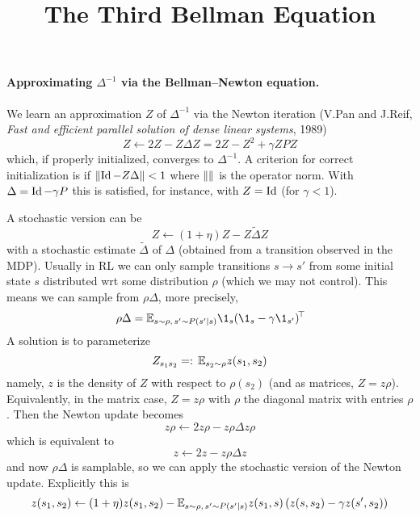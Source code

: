 \documentclass[11pt,a4paper]{article}
\title{The Third Bellman Equation}
\author{}
\begin{document}
\maketitle

\paragraph{Approximating $\Delta^{-1}$ via the Bellman--Newton equation.}
We learn an approximation $Z$ of $\Delta^{-1}$ via the Newton iteration
(V.Pan and J.Reif, \emph{Fast and efficient parallel solution of dense
linear systems}, 1989)
\begin{equation}
Z\gets 2Z-Z\Delta Z=2Z-Z^2+\gamma ZPZ
\end{equation}
which, if properly initialized, converges to $\Delta^{-1}$. A criterion
for correct initialization is if $\left\lVert\operatorname{Id}-Z\Delta\right\rVert<1$ where $\left\lVert\right\rVert$
is the operator norm. With $\Delta=\operatorname{Id}-\gamma P$ this is satisfied, for
instance, with $Z=\operatorname{Id}$ (for $\gamma<1$).

A stochastic version can be
\begin{equation}
Z\gets (1+\eta) Z-Z\tilde \Delta Z
\end{equation}
with a stochastic estimate $\tilde \Delta$ of $\Delta$ (obtained from a
transition observed in the MDP). Usually in RL we can only sample
transitions $s\to s'$ from some initial state $s$ distributed wrt some
distribution $\rho$ (which we may not control). This means we can sample
from $\rho \Delta$, more precisely,
\begin{equation}
\rho\Delta=\E_{s\sim \rho,\,s'\sim P(s'|s)}
\1_s\transp{(\1_s-\gamma\1_{s'})}
\end{equation}
A solution is to parameterize
\begin{equation}
Z_{s_1s_2}=\mathrel{\mathop{:}} \,\mathbb{E}_{s_2\sim \rho} z(s_1,s_2)
\end{equation}
namely, $z$ is the density of $Z$ with respect to $\rho(s_2)$ (and as
matrices,
$Z=z\rho$).
Equivalently, in the matrix case, $Z=z\rho$ with $\rho$ the diagonal
matrix with entries $\rho$. Then the Newton update becomes
\begin{equation}
z\rho\gets 2z\rho-z\rho\Delta z\rho
\end{equation}
which is equivalent to
\begin{equation}
z\gets 2z-z\rho\Delta z
\end{equation}
and now $\rho \Delta$ is samplable,
so we can apply the stochastic version of the Newton update. Explicitly
this is
\begin{equation}
z(s_1,s_2)\gets (1+\eta) z(s_1,s_2)-
\mathbb{E}_{s\sim \rho,\,s'\sim P(s'|s)}z(s_1,s)\left(z(s,s_2)-\gamma
z(s',s_2)\right)
\end{equation}
\end{document}
